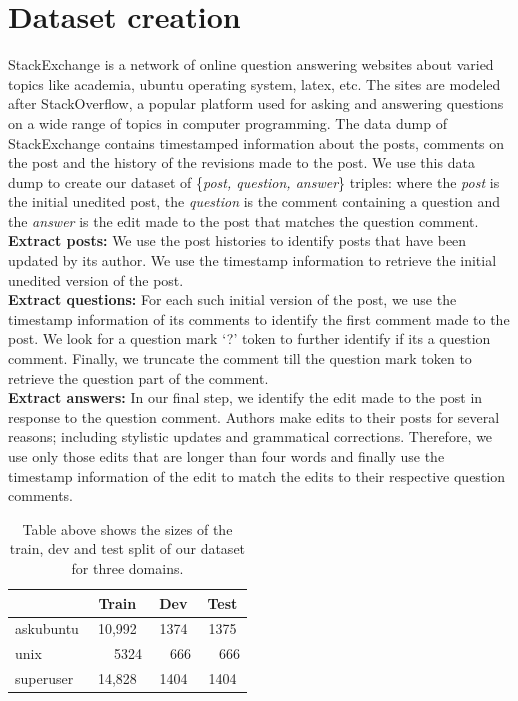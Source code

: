 \documentclass[11pt]{report}
\begin{document}
\section{Dataset creation}\label{dataset_creation}
StackExchange is a network of online question answering websites about varied topics like academia, ubuntu operating system, latex, etc. The sites are modeled after StackOverflow, a popular platform used for asking and answering questions on a wide range of topics in computer programming. The data dump of StackExchange contains timestamped information about the posts, comments on the post and the history of the revisions made to the post. We use this data dump to create our dataset of \{\textit{post, question, answer}\} triples: where the \textit{post} is the initial unedited post, the \textit{question} is the comment containing a question and the \textit{answer} is the edit made to the post that matches the question comment. \\
\textbf{Extract posts:} We use the post histories to identify posts that have been updated by its author. We use the timestamp information to retrieve the initial unedited version of the post.\\
\textbf{Extract questions:} For each such initial version of the post, we use the timestamp information of its comments to identify the first comment made to the post. We look for a question mark `?' token to further identify if its a question comment. Finally, we truncate the comment till the question mark token to retrieve the question part of the comment.\\
\textbf{Extract answers:} In our final step, we identify the edit made to the post in response to the question comment. Authors make edits to their posts for several reasons; including stylistic updates and grammatical corrections. Therefore, we use only those edits that are longer than four words and finally use the timestamp information of the edit to match the edits to their respective question comments.

\begin{table}
\centering
\begin{tabular}{lccc}
\toprule
& Train & Dev & Test  \\
\midrule
askubuntu & 10,992 & 1374 & 1375\\
unix & ~~~5324 & ~~666 & ~~666 \\
superuser & 14,828 & 1404 & 1404 \\
\bottomrule
\end{tabular}
\label{data_statistics}
\caption{Table above shows the sizes of the train, dev and test split of our dataset for three domains.}
\end{table}
\end{document}
